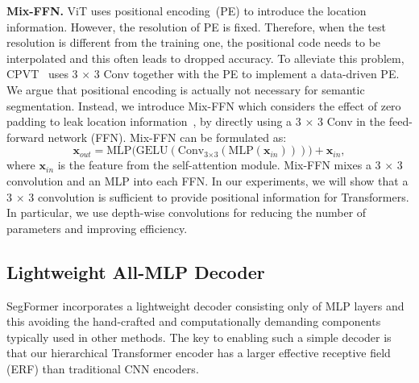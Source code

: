 \textbf{Mix-FFN.} 
ViT uses positional encoding~(PE) to introduce the location information. However, the resolution of PE is fixed. Therefore, when the test resolution is different from the training one, the positional code needs to be interpolated and this often leads to dropped accuracy. To alleviate this problem, CPVT~\cite{chu2021conditional} uses 3 $\times$ 3 Conv together with the PE to implement a data-driven PE. We argue that positional encoding is actually not necessary for semantic segmentation. Instead, we introduce Mix-FFN which considers the effect of zero padding to leak location information~\cite{islam2020much}, by directly using a 3 $\times$ 3 Conv in the feed-forward network (FFN). Mix-FFN can be formulated as:
\begin{equation}
    {\mathbf{x}_{out} = {\text{MLP(GELU}(\text{Conv}_{\text{3} \times \text{3}}(\text{MLP}(\mathbf{x}_{in}))))+ \mathbf{x}_{in}},}
    \label{eqn:mixffn}
\end{equation}
where $\mathbf{x}_{in}$ is the feature from the self-attention module. Mix-FFN mixes a 3 $\times$ 3 convolution and an MLP into each FFN. In our experiments, we will show that a 3 $\times$ 3 convolution is sufficient to provide positional information for Transformers. In particular, we use depth-wise convolutions for reducing the number of parameters and improving efficiency. 



\subsection{Lightweight All-MLP Decoder} \label{sec:MLP}

SegFormer incorporates a lightweight decoder consisting only of MLP layers and this avoiding the hand-crafted and computationally demanding components typically used in other methods. The key to enabling such a simple decoder is that our hierarchical Transformer encoder has a larger effective receptive field (ERF) than traditional CNN encoders. 


